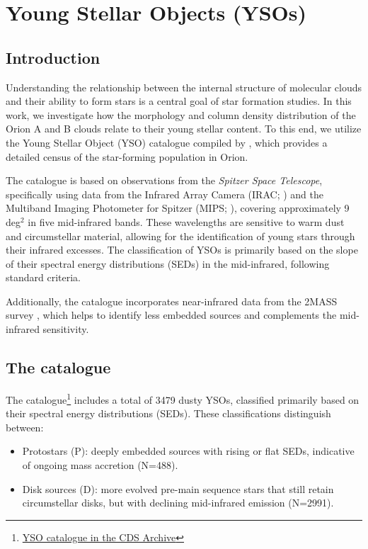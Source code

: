 \section{Young Stellar Objects (YSOs)}

\subsection{Introduction}

Understanding the relationship between the internal structure of molecular clouds and their ability to form stars is a central goal of star formation studies. In this work, we investigate how the morphology and column density distribution of the Orion A and B clouds relate to their young stellar content. To this end, we utilize the Young Stellar Object (YSO) catalogue compiled by \cite{megeath2012catalogue}, which provides a detailed census of the star-forming population in Orion.

The catalogue is based on observations from the \textit{Spitzer Space Telescope}, specifically using data from the Infrared Array Camera (IRAC; \cite{fazio2004IRAC}) and the Multiband Imaging Photometer for Spitzer (MIPS; \cite{rieke2004MIPS}), covering approximately 9 deg$^2$ in five mid-infrared bands. These wavelengths are sensitive to warm dust and circumstellar material, allowing for the identification of young stars through their infrared excesses. The classification of YSOs is primarily based on the slope of their spectral energy distributions (SEDs) in the mid-infrared, following standard criteria.

Additionally, the catalogue incorporates near-infrared data from the 2MASS survey \cite{skrutskie2006two}, which helps to identify less embedded sources and complements the mid-infrared sensitivity.

\subsection{The catalogue}
The catalogue\footnote{\href{http://cdsarc.cds.unistra.fr}{YSO catalogue in the CDS Archive}} includes a total of 3479 dusty YSOs, classified primarily based on their spectral energy distributions (SEDs). These classifications distinguish between:
\begin{itemize}
    \item Protostars (P): deeply embedded sources with rising or flat SEDs, indicative of ongoing mass accretion (N=488).
    \item Disk sources (D): more evolved pre-main sequence stars that still retain circumstellar disks, but with declining mid-infrared emission (N=2991).
\end{itemize}

